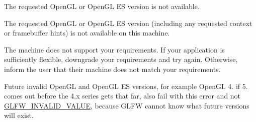 The requested Open\+GL or Open\+GL ES version is not available. 

The requested Open\+GL or Open\+GL ES version (including any requested context or framebuffer hints) is not available on this machine.

The machine does not support your requirements. If your application is sufficiently flexible, downgrade your requirements and try again. Otherwise, inform the user that their machine does not match your requirements.

\begin{DoxyParagraph}{}
Future invalid Open\+GL and Open\+GL ES versions, for example Open\+GL 4. if 5. comes out before the 4.\+x series gets that far, also fail with this error and not \hyperlink{group__errors_gaaf2ef9aa8202c2b82ac2d921e554c687}{G\+L\+F\+W\+\_\+\+I\+N\+V\+A\+L\+I\+D\+\_\+\+V\+A\+L\+UE}, because G\+L\+FW cannot know what future versions will exist. 
\end{DoxyParagraph}
